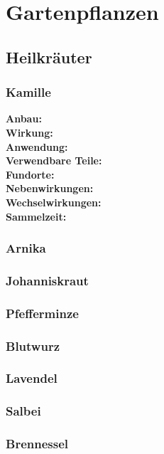 \chapter{Gartenpflanzen}

\section{Heilkräuter}
\lipsum[2]

\subsection{Kamille}

\textbf{Anbau:} \\
\textbf{Wirkung:} \\
\textbf{Anwendung:} \\
\textbf{Verwendbare Teile:} \\
\textbf{Fundorte:} \\
\textbf{Nebenwirkungen:} \\
\textbf{Wechselwirkungen:} \\
\textbf{Sammelzeit:}

\subsection{Arnika}

\subsection{Johanniskraut}

\subsection{Pfefferminze}

\subsection{Blutwurz}

\subsection{Lavendel}

\subsection{Salbei}

\subsection{Brennessel}

